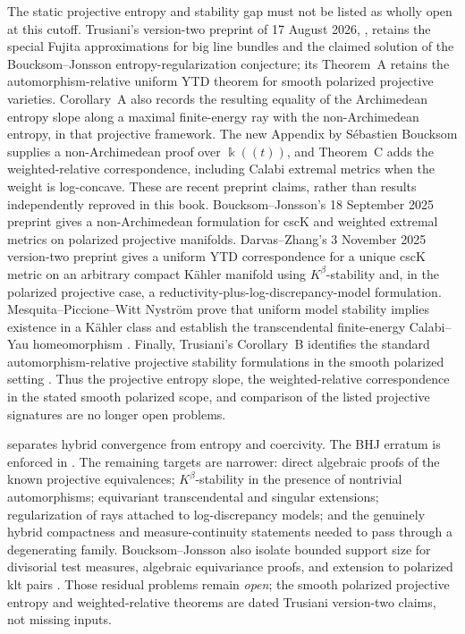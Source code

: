 The static projective entropy and stability gap must not be listed as wholly
open at this cutoff.
Trusiani's version-two preprint of 17 August 2026,
\cite[Theorem~B and Corollary~A]{Trusiani26}, retains the special Fujita
approximations for big line bundles and the claimed solution of the
Boucksom--Jonsson entropy-regularization conjecture; its Theorem~A retains
the automorphism-relative uniform YTD theorem for smooth polarized
projective varieties.  Corollary~A also records the resulting equality of
the Archimedean entropy slope along a maximal finite-energy ray with the
non-Archimedean entropy, in that projective framework.  The new Appendix by
S\'ebastien Boucksom supplies a non-Archimedean proof over
\(\Bbbk((t))\), and Theorem~C adds the weighted-relative correspondence,
including Calabi extremal metrics when the weight is log-concave.  These are
recent preprint claims, rather than results independently reproved in this
book.  Boucksom--Jonsson's 18 September 2025
preprint \cite{BJ25WeightedYTD} gives a
non-Archimedean formulation for cscK and weighted extremal metrics on
polarized projective manifolds.  Darvas--Zhang's 3 November 2025 version-two
preprint \cite[Theorems~1.6 and~5.5]{DarvasZhang25YTD} gives a uniform
YTD correspondence for a unique cscK metric on an arbitrary compact
Kähler manifold using \(K^\beta\)-stability and, in the polarized
projective case, a reductivity-plus-log-discrepancy-model formulation.
Mesquita--Piccione--Witt Nyström prove that uniform model stability implies
existence in a Kähler class and establish the transcendental finite-energy
Calabi--Yau homeomorphism \cite[Theorems~A and~B]{MPWN25}.  Finally,
Trusiani's Corollary~B identifies the standard automorphism-relative
projective stability formulations in the smooth polarized setting
\cite{Trusiani26}.  Thus the projective entropy slope, the weighted-relative
correspondence in the stated smooth polarized scope, and comparison of the
listed projective signatures are no longer open problems.

 separates hybrid convergence from
entropy and coercivity.  The BHJ erratum is enforced in
.  The remaining targets are narrower: direct
algebraic proofs of the known projective equivalences; \(K^\beta\)-stability
in the presence of nontrivial automorphisms; equivariant transcendental and
singular extensions; regularization of rays attached to log-discrepancy
models; and the genuinely hybrid compactness and measure-continuity
statements needed to pass through a degenerating family.  Boucksom--Jonsson
also isolate bounded support size for divisorial test measures, algebraic
equivariance proofs, and extension to polarized klt pairs
\cite[Questions and further remarks]{BJ25WeightedYTD}.  Those residual
problems remain \emph{open}; the smooth polarized projective entropy and
weighted-relative theorems are dated Trusiani version-two claims, not
missing inputs.

